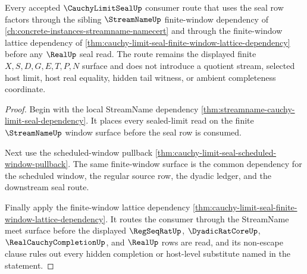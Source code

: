 \begin{theorem}
\label{thm:cauchy-limit-seal-streamname-lattice-orphan-link}
Every accepted $\CauchyLimitSealUp$ consumer route that uses the seal row
factors through the sibling $\StreamNameUp$ finite-window dependency of
\autoref{ch:concrete-instances-streamname-namecert} and through the
finite-window lattice dependency of
\autoref{thm:cauchy-limit-seal-finite-window-lattice-dependency} before any
$\RealUp$ seal read. The route remains the displayed finite
$X,S,D,G,E,T,P,N$ surface and does not introduce a quotient stream, selected
host limit, host real equality, hidden tail witness, or ambient completeness
coordinate.
\end{theorem}
\begin{proof}
Begin with the local StreamName dependency
\autoref{thm:streamname-cauchy-limit-seal-dependency}. It places every
sealed-limit read on the finite $\StreamNameUp$ window surface before the
seal row is consumed.

Next use the scheduled-window pullback
\autoref{thm:cauchy-limit-seal-scheduled-window-pullback}. The same
finite-window surface is the common dependency for the scheduled window, the
regular source row, the dyadic ledger, and the downstream seal route.

Finally apply the finite-window lattice dependency
\autoref{thm:cauchy-limit-seal-finite-window-lattice-dependency}. It routes
the consumer through the StreamName meet surface before the displayed
$\RegSeqRatUp$, $\DyadicRatCoreUp$, $\RealCauchyCompletionUp$, and $\RealUp$
rows are read, and its non-escape clause rules out every hidden completion or
host-level substitute named in the statement.
\end{proof}
